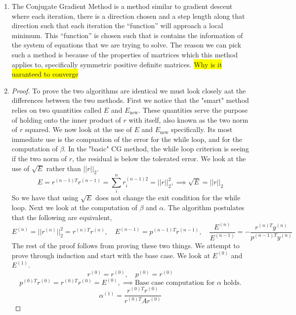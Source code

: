 \documentclass{article}
\begin{document}
    \begin{enumerate}

        \item The Conjugate Gradient Method is a method similar to gradient descent where each iteration, there is a direction chosen and a step length along that direction such that each iteration the ``function'' will approach a local minimum. This ``function'' is chosen such that is contains the information of the system of equations that we are trying to solve. The reason we can pick such a method is because of the properties of martrices which this method applies to, specifically symmetric positive definite matrices. \colorbox{yellow}{Why is it uaranteed to converge}
    
        \item 

        \begin{proof}
            To prove the two algorithms are identical we must look closely aat the differences between the two methods. First we notice that the "smart" method relies on two quantities called $E$ and $E_{\text{new}}$. These quantities serve the purpose of holding onto the inner product of $r$ with itself, also known as the two norm of $r$ squared. We now look at the use of $E$ and $E_{\text{new}}$ specifically. Its most immediate use is the compuation of the error for the while loop, and for the computation of $\beta$. In the "basic" CG method, the while loop criterion is seeing if the two norm of $r$, the residual is below the tolerated error. We look at the use of $\sqrt{E}$ rather than $||r||_2$. 
        \[
            E = r^{(n-1)T}r^{(n-1)} = \sum_i^n r_i^{(n-1)2} = ||r||_2^2, \implies \sqrt{E} = ||r||_2
        \]
        So we have that using $\sqrt{E}$ does not change the exit condition for the while loop. Next we look at the computation of $\beta$ and $\alpha$. The algorithm postulates that the following are equivalent, 
        \[
            E^{(n)} = ||r^{(n)}||_2^2 = r^{(n)T}r^{(n)}, \quad E^{(n-1)} = p^{(n-1)T}r^{(n-1)}, \quad \frac{E^{(n)}}{E^{(n-1)}} = -\frac{r^{(n)T}y^{(n)}}{p^{(n-1)T}y^{(n)}}
        \]
        The rest of the proof follows from proving these two things. We attempt to prove through induction and start with the base case. We look at $E^{(0)}$ and $E^{(1)}$. 
        \[
            r^{(0)} = r^{(0)},\quad p^{(0)} = r^{(0)}
        \]
        \[
            p^{(0)T}r^{(0)} = r^{(0)T}r^{(0)} = E^{(0)}, \implies \text{Base case computation for $\alpha$ holds.}
        \]
        \[
            \alpha^{(1)} = \frac{r^{(0)T}r^{(0)}}{r^{(0)T}Ar^{(0)}} 
\]
\end{proof}
\end{enumerate}
\end{document}
